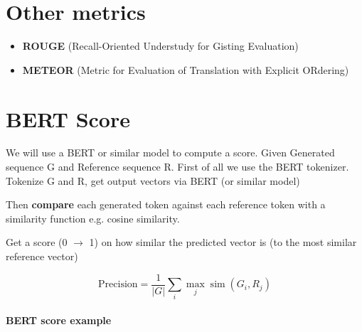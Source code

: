 \section{Other metrics}

\begin{itemize}
  \item \textbf{ROUGE} (Recall-Oriented Understudy for Gisting Evaluation)
  \item \textbf{METEOR} (Metric for Evaluation of Translation with Explicit ORdering)
\end{itemize}

\section{BERT Score}
We will use a BERT or similar model to compute a score.
Given Generated sequence G and Reference sequence R. First of all we use the BERT tokenizer.
Tokenize G and R, get output vectors via BERT (or similar model)

Then \textbf{compare} each generated token against each reference token with a similarity function e.g. cosine similarity.

Get a score (0 $\to$ 1) on how similar the predicted vector is (to the most similar
reference vector)

\begin{equation*}
  \text{Precision} = \frac{1}{|G|}\sum_{i} \max_j \operatorname{sim}(G_i, R_j)
\end{equation*}

\paragraph{BERT score example}


